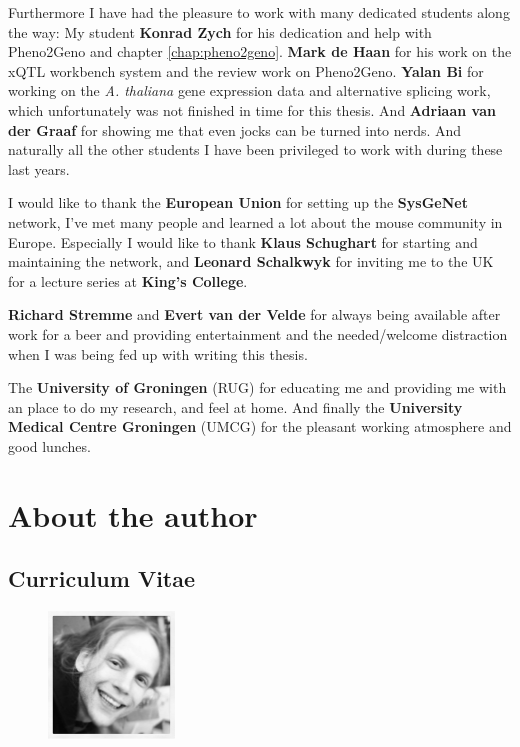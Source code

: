 Furthermore I have had the pleasure to work with many dedicated students along the way: 
My student {\bf Konrad Zych} for his dedication and help with Pheno2Geno and chapter \ref{chap:pheno2geno}. 
{\bf Mark de Haan} for his work on the xQTL workbench system and the review work on Pheno2Geno.
{\bf Yalan Bi} for working on the \emph{A. thaliana} gene expression data and alternative splicing 
work, which unfortunately was not finished in time for this thesis. And {\bf Adriaan van der Graaf} for 
showing me that even jocks can be turned into nerds. And naturally all the other students I have been 
privileged to work with during these last years.

I would like to thank the {\bf European Union} for setting up the {\bf SysGeNet} network, I've met 
many people and learned a lot about the mouse community in Europe. Especially I would like to thank 
{\bf Klaus Schughart} for starting and maintaining the network, and {\bf Leonard Schalkwyk} for 
inviting me to the UK for a lecture series at {\bf King's College}.

{\bf Richard Stremme} and {\bf Evert van der Velde} for always being available after work for 
a beer and providing entertainment and the needed/welcome distraction when I was being fed up 
with writing this thesis.

The {\bf University of Groningen} (RUG) for educating me and providing me with an place to do my 
research, and feel at home. And finally the {\bf University Medical Centre Groningen} (UMCG) for 
the pleasant working atmosphere and good lunches.

\newpage

\section{About the author}
\subsection{Curriculum Vitae}

\begin{figure}
  \centering
  \includegraphics[width=0.3\textwidth]{eps/image_6_1.eps}
\end{figure}

